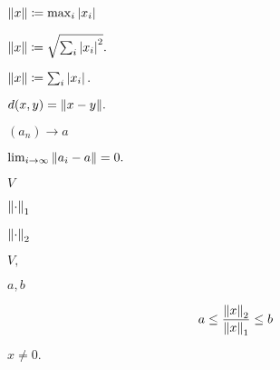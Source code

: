 \documentclass[10pt]{book}
\begin{document}
\begin{mdSnippets}
\begin{mdInlineSnippet}[00917ca72c7f74debc70f008746dd602]
$\norm{x} \coloneqq \max_i \left\vert x_i\right\vert$\end{mdInlineSnippet}%
\begin{mdInlineSnippet}[cdb09fe2967ac03813437e5a612037b0]%
$\norm{x} \coloneqq \sqrt{\sum_i \left\vert x_i\right\vert^2}.$\end{mdInlineSnippet}%
\begin{mdInlineSnippet}[651172bbf1124d5431154973ef2ab17b]%
$\norm{x} \coloneqq \sum_i \left\vert x_i\right\vert.$\end{mdInlineSnippet}%
\begin{mdInlineSnippet}[39a41e1424b3355a8904fb82f2b83d43]%
$d(x,y) = \norm{x-y}.$\end{mdInlineSnippet}%
\begin{mdInlineSnippet}[128a7ec99cd3d7fb6bc9f20330d6530a]%
$(a_n) \to a$\end{mdInlineSnippet}%
\begin{mdInlineSnippet}[90550906a9bf99f97847c77130569271]%
$\lim_{i \to \infty} \norm{a_i - a} = 0.$\end{mdInlineSnippet}%
\begin{mdInlineSnippet}[5206560a306a2e085a437fd258eb57ce]%
$V$\end{mdInlineSnippet}%
\begin{mdInlineSnippet}[ebbcacc5f90630860b95eb257b007b9a]%
$\norm{\cdot}_1$\end{mdInlineSnippet}%
\begin{mdInlineSnippet}[b74a8c5fe50151e1fafde6da43b1fe8a]%
$\norm{\cdot}_2$\end{mdInlineSnippet}%
\begin{mdInlineSnippet}[a787dbc2f9902096a8fb13903dd63428]%
$V,$\end{mdInlineSnippet}%
\begin{mdInlineSnippet}[b345e1dc09f20fdefdea469f09167892]%
$a,b$\end{mdInlineSnippet}%
\begin{mdDisplaySnippet}[b7b6df373ffcb5df066f5cc70d81c0ce]%
\[%
a \le \frac{\norm{x}_2}{\norm{x}_1} \le b
\]%
\end{mdDisplaySnippet}%
\begin{mdInlineSnippet}[3198651f791aee4036bd038ad164424f]%
$x \ne 0.$\end{mdInlineSnippet}%

\end{mdSnippets}
\end{document}
